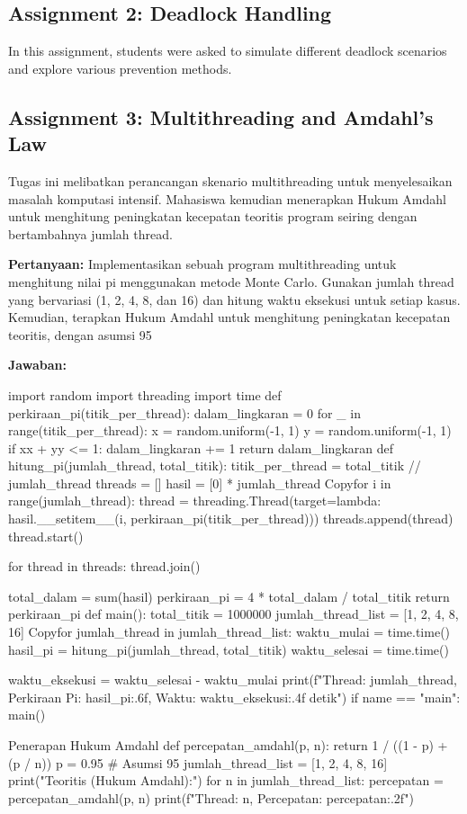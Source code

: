 \documentclass[12pt]{article}
\begin{document}
\subsection{Assignment 2: Deadlock Handling}
In this assignment, students were asked to simulate different deadlock scenarios and explore various prevention methods.

\subsection{Assignment 3: Multithreading and Amdahl's Law}
\noindent Tugas ini melibatkan perancangan skenario multithreading untuk menyelesaikan masalah komputasi intensif. Mahasiswa kemudian menerapkan Hukum Amdahl untuk menghitung peningkatan kecepatan teoritis program seiring dengan bertambahnya jumlah thread.

\textbf{Pertanyaan:}
\noindent Implementasikan sebuah program multithreading untuk menghitung nilai pi menggunakan metode Monte Carlo. Gunakan jumlah thread yang bervariasi (1, 2, 4, 8, dan 16) dan hitung waktu eksekusi untuk setiap kasus. Kemudian, terapkan Hukum Amdahl untuk menghitung peningkatan kecepatan teoritis, dengan asumsi 95%

\textbf{Jawaban:}
\begin{python}
import random
import threading
import time
def perkiraan_pi(titik_per_thread):
dalam_lingkaran = 0
for _ in range(titik_per_thread):
x = random.uniform(-1, 1)
y = random.uniform(-1, 1)
if xx + yy <= 1:
dalam_lingkaran += 1
return dalam_lingkaran
def hitung_pi(jumlah_thread, total_titik):
titik_per_thread = total_titik // jumlah_thread
threads = []
hasil = [0] * jumlah_thread
Copyfor i in range(jumlah_thread):
    thread = threading.Thread(target=lambda: hasil.__setitem__(i, perkiraan_pi(titik_per_thread)))
    threads.append(thread)
    thread.start()

for thread in threads:
    thread.join()

total_dalam = sum(hasil)
perkiraan_pi = 4 * total_dalam / total_titik
return perkiraan_pi
def main():
total_titik = 1000000
jumlah_thread_list = [1, 2, 4, 8, 16]
Copyfor jumlah_thread in jumlah_thread_list:
    waktu_mulai = time.time()
    hasil_pi = hitung_pi(jumlah_thread, total_titik)
    waktu_selesai = time.time()
    
    waktu_eksekusi = waktu_selesai - waktu_mulai
    print(f"Thread: {jumlah_thread}, Perkiraan Pi: {hasil_pi:.6f}, Waktu: {waktu_eksekusi:.4f} detik")
if name == "main":
main()

Penerapan Hukum Amdahl
def percepatan_amdahl(p, n):
return 1 / ((1 - p) + (p / n))
p = 0.95  # Asumsi 95%
jumlah_thread_list = [1, 2, 4, 8, 16]
print("\nPercepatan Teoritis (Hukum Amdahl):")
for n in jumlah_thread_list:
percepatan = percepatan_amdahl(p, n)
print(f"Thread: {n}, Percepatan: {percepatan:.2f}")
\end{python}
\end{document}
